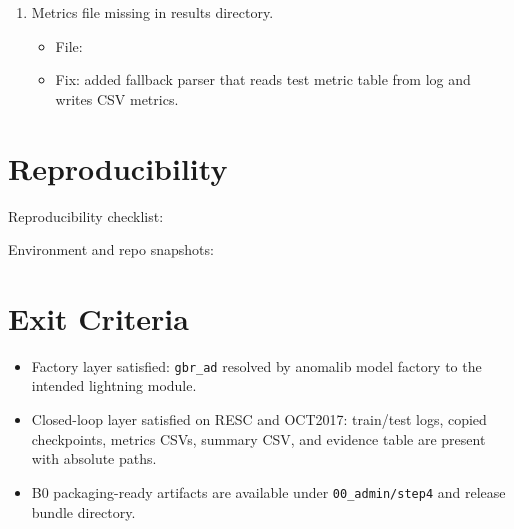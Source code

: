 \documentclass[11pt]{article}
\begin{document}
\begin{enumerate}
\begin{itemize}
  \item Fix: forced single-process loading (\texttt{num\_workers=0}) to avoid multiprocessing shared-memory path.
  \end{itemize}
\item Metrics file missing in results directory.
  \begin{itemize}
  \item File: 
  \item Fix: added fallback parser that reads test metric table from log and writes CSV metrics.
  \end{itemize}
\end{enumerate}

\section{Reproducibility}
Reproducibility checklist:

Environment and repo snapshots:

\section{Exit Criteria}
\begin{itemize}
\item Factory layer satisfied: \texttt{gbr\_ad} resolved by anomalib model factory to the intended lightning module.
\item Closed-loop layer satisfied on RESC and OCT2017: train/test logs, copied checkpoints, metrics CSVs, summary CSV, and evidence table are present with absolute paths.
\item B0 packaging-ready artifacts are available under \texttt{00\_admin/step4} and release bundle directory.
\end{itemize}
\end{document}
